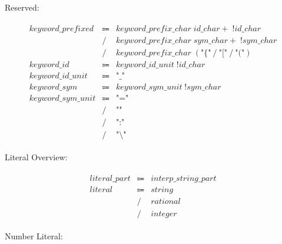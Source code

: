 Reserved:

\begin{align*}
    \begin{array}{rcll}
        \mathit{keyword\_prefixed}
        &\Coloneq &\mathit{keyword\_prefix\_char}\; \mathit{id\_char}{+}\; \mathop{!} \mathit{id\_char} \\
        &\mathrel{/} &\mathit{keyword\_prefix\_char}\; \mathit{sym\_char}{+}\; \mathop{!} \mathit{sym\_char} \\
        &\mathrel{/} &\mathit{keyword\_prefix\_char}\; (\texttt{"\{"} \mathrel{/} \texttt{"["} \mathrel{/} \texttt{"("}) \\
        \mathit{keyword\_id}
        &\Coloneq &\mathit{keyword\_id\_unit}\; \mathop{!} \mathit{id\_char} \\
        \mathit{keyword\_id\_unit}
        &\Coloneq &\texttt{"\_"} \\
        \mathit{keyword\_sym}
        &\Coloneq &\mathit{keyword\_sym\_unit}\; \mathop{!} \mathit{sym\_char} \\
        \mathit{keyword\_sym\_unit}
        &\Coloneq &\texttt{"="} \\
        &\mathrel{/} &\texttt{"\^{}"} \\
        &\mathrel{/} &\texttt{":"} \\
        &\mathrel{/} &\texttt{"\textbackslash"}
    \end{array}
\end{align*}

Literal Overview:

\begin{align*}
    \begin{array}{rcll}
        \mathit{literal\_part}
        &\Coloneq &\mathit{interp\_string\_part} \\
        \mathit{literal}
        &\Coloneq &\mathit{string} \\
        &\mathrel{/} &\mathit{rational} \\
        &\mathrel{/} &\mathit{integer}
    \end{array}
\end{align*}

Number Literal:

